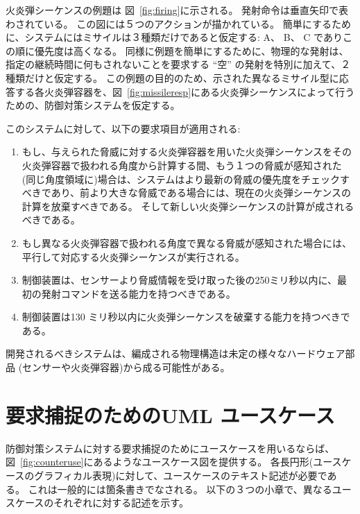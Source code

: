 \documentclass[\pformat,12pt]{jreport}
\begin{document}
火炎弾シーケンスの例題は 図~\ref{fig:firing}に示される。
発射命令は垂直矢印で表わされている。
この図には５つのアクションが描かれている。
簡単にするために、システムにはミサイルは３種類だけであると仮定する: A、 B、 C でありこの順に優先度は高くなる。
同様に例題を簡単にするために、物理的な発射は、指定の継続時間に何もされないことを要求する ``空'' の発射を特別に加えて、２種類だけと仮定する。 
この例題の目的のため、示された異なるミサイル型に応答する各火炎弾容器を、図~\ref{fig:missileresp}にある火炎弾シーケンスによって行うための、防御対策システムを仮定する。

このシステムに対して、以下の要求項目が適用される:

\begin{enumerate}
\item もし、与えられた脅威に対する火炎弾容器を用いた火炎弾シーケンスをその火炎弾容器で扱われる角度から計算する間、もう１つの脅威が感知された(同じ角度領域に)場合は、システムはより最新の脅威の優先度をチェックすべきであり、前より大きな脅威である場合には、現在の火炎弾シーケンスの計算を放棄すべきである。
そして新しい火炎弾シーケンスの計算が成されるべきである。
\item もし異なる火炎弾容器で扱われる角度で異なる脅威が感知された場合には、平行して対応する火炎弾シーケンスが実行される。
\item 制御装置は、センサーより脅威情報を受け取った後の250ミリ秒以内に、最初の発射コマンドを送る能力を持つべきである。\label{timereq34}
\item 制御装置は130 ミリ秒以内に火炎弾シーケンスを破棄する能力を持つべきである。
\end{enumerate}

開発されるべきシステムは、編成される物理構造は未定の様々なハードウェア部品 (センサーや火炎弾容器)から成る可能性がある。

\section{要求捕捉のためのUML ユースケース}\label{sec:UMLreq} 
\label{sec:usecase}

防御対策システムに対する要求捕捉のためにユースケースを用いるならば、図~\ref{fig:counteruse}にあるようなユースケース図を提供する。
各長円形(ユースケースのグラフィカル表現)に対して、ユースケースのテキスト記述が必要である。
これは一般的には箇条書きでなされる。
以下の３つの小章で、異なるユースケースのそれぞれに対する記述を示す。
\end{document}
